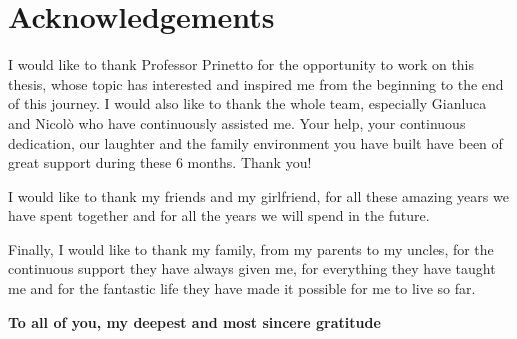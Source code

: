 \chapter*{Acknowledgements}\label{chap:Acknowledgements}\thispagestyle{empty}

I would like to thank Professor Prinetto for the opportunity to work on this thesis, whose topic has interested and inspired me from the beginning to the end of this journey. I would also like to thank the whole team, especially Gianluca and Nicolò who have continuously assisted me. Your help, your continuous dedication, our laughter and the family environment you have built have been of great support during these 6 months. Thank you!

\bigskip
\bigskip

\noindent I would like to thank my friends and my girlfriend, for all these amazing years we have spent together and for all the years we will spend in the future.

\bigskip
\bigskip

\noindent Finally, I would like to thank my family, from my parents to my uncles, for the continuous support they have always given me, for everything they have taught me and for the fantastic life they have made it possible for me to live so far.

\bigskip
\bigskip
\bigskip
\bigskip

\textbf{To all of you, my deepest and most sincere gratitude}